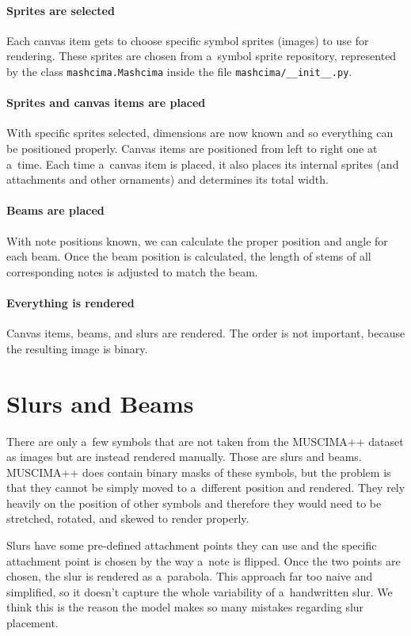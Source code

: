 \paragraph{Sprites are selected} Each canvas item gets to choose specific symbol sprites (images) to use for rendering. These sprites are chosen from a~symbol sprite repository, represented by the class \verb`mashcima`\allowbreak\verb`.Mashcima` inside the file \verb`mashcima/`\allowbreak\verb`__init__.py`.

\paragraph{Sprites and canvas items are placed} With specific sprites selected, dimensions are now known and so everything can be positioned properly. Canvas items are positioned from left to right one at a~time. Each time a~canvas item is placed, it also places its internal sprites (and attachments and other ornaments) and determines its total width.

\paragraph{Beams are placed} With note positions known, we can calculate the proper position and angle for each beam. Once the beam position is calculated, the length of stems of all corresponding notes is adjusted to match the beam.

\paragraph{Everything is rendered} Canvas items, beams, and slurs are rendered. The order is not important, because the resulting image is binary.


\section{Slurs and Beams}

There are only a~few symbols that are not taken from the MUSCIMA++ dataset as images but are instead rendered manually. Those are slurs and beams. MUSCIMA++ does contain binary masks of these symbols, but the problem is that they cannot be simply moved to a~different position and rendered. They rely heavily on the position of other symbols and therefore they would need to be stretched, rotated, and skewed to render properly.

Slurs have some pre-defined attachment points they can use and the specific attachment point is chosen by the way a~note is flipped. Once the two points are chosen, the slur is rendered as a~parabola. This approach far too naive and simplified, so it doesn't capture the whole variability of a~handwritten slur. We think this is the reason the model makes so many mistakes regarding slur placement.

